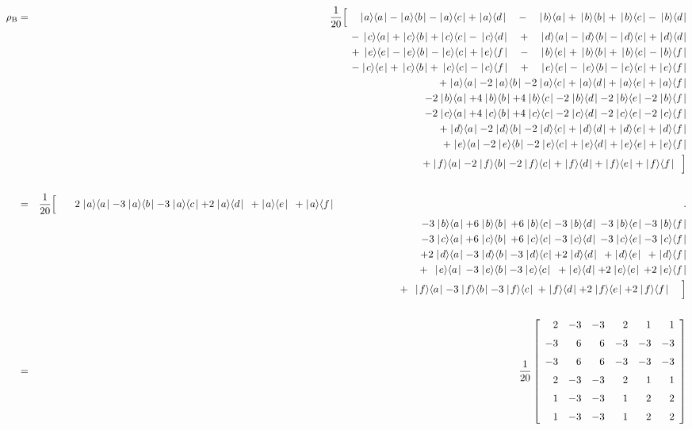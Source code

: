 \begin{eqnarray*}
	\rho_{\rm B}&=& \frac{1}{20}\Big[\quad\kb{a}{a}-\kb{a}{b}-\kb{a}{c}+\kb{a}{d}\quad-\quad\kb{b}{a}+\,\kb{b}{b}+\,\kb{b}{c}-\,\kb{b}{d} \\
		&&    \quad\:\:\,-\,\kb{c}{a}+\kb{c}{b}+\kb{c}{c}-\,\kb{c}{d} \quad+ \quad \kb{d}{a}-\kb{d}{b}-\kb{d}{c}+\kb{d}{d} \\
		&&    \quad\:\:\,+\,\kb{e}{e}-\kb{e}{b}-\kb{e}{c}+\kb{e}{f} \quad-\quad \kb{b}{e}+\,\kb{b}{b}+\,\kb{b}{c}-\kb{b}{f} \\
		&&    \quad\:\:\,-\kb{c}{e}+\,\kb{c}{b}+\,\kb{c}{c}-\kb{c}{f}\quad+\quad\kb{e}{e}-\,\kb{e}{b}-\kb{e}{c}+\kb{e}{f} \\
		&&    \quad\:\:\,+\kb{a}{a}-2\kb{a}{b}-2\kb{a}{c}+\kb{a}{d}+\kb{a}{e}+\kb{a}{f}   
		\\ &&  \quad\:\:\,- 2\kb{b}{a}+4\kb{b}{b}+4\kb{b}{c}-2\kb{b}{d}-2\kb{b}{e}-2\kb{b}{f} \\
		&&    \quad\:\:\,-2\kb{c}{a}+4\kb{c}{b}+4\kb{c}{c}-2\kb{c}{d}-2\kb{c}{e}-2\kb{c}{f}\\
		&& \quad\:\:\,+\kb{d}{a}-2\kb{d}{b}-2\kb{d}{c}+\kb{d}{d}+\kb{d}{e}+\kb{d}{f} \\
		&&  	\:\quad\:\:\, +\kb{e}{a}-2\kb{e}{b}-2\kb{e}{c}+\kb{e}{d}+\kb{e}{e}+\kb{e}{f}
		\\ && 	\:\quad\:\:\, +\kb{f}{a}-2\kb{f}{b}-2\kb{f}{c}+\kb{f}{d}+\kb{f}{e}+\kb{f}{f} \:\:\Big]
\\ \\
 &=& \frac{1}{20}\Big[\quad\;\;\;2\kb{a}{a} - 3\kb{a}{b} - 3\kb{a}{c} + 2\kb{a}{d} \,\;+\kb{a}{e}\;\, + \kb{a}{f} \qquad\qquad\qquad\qquad\qquad\qquad\qquad\qquad\qquad\qquad 
			\qquad\qquad\qquad\qquad\qquad\qquad\qquad.\\
		&& \qquad  \:\:\:\,- 3\kb{b}{a} +6\kb{b}{b} \,+6\kb{b}{c}-3\kb{b}{d}\, -3\kb{b}{e} -3\kb{b}{f} \\
		&& \qquad  \:\:\:\,- 3\kb{c}{a} +6\kb{c}{b} \,+6\kb{c}{c}-3\kb{c}{d} \,-3\kb{c}{e} -3\kb{c}{f} \\
		&& \qquad  \:\:\:\,+ 2\kb{d}{a} - 3\kb{d}{b} - 3\kb{d}{c} + 2\kb{d}{d} \;\,+\kb{d}{e}\;\, + \kb{d}{f} \\
		&& \qquad  \:\:\:\,+ \;\,\kb{e}{a}\, -3\kb{e}{b} -3\kb{e}{c}\;\:+ \kb{e}{d} + 2\kb{e}{e} \,+ 2\kb{e}{f} \\
		&& \qquad  \:\:\:\,+ \;\,\kb{f}{a} -3\kb{f}{b} -3\kb{f}{c}\:+ \kb{f}{d} + 2\kb{f}{e} + 2\kb{f}{f} \quad\Big] \\ \\ 
		&=& \frac{1}{20}\left[
			\begin {array}{rrrrrr}
			2&-3&-3&2&1&1\\
			\noalign{\medskip}
			-3&6&6&-3&-3&-3 \\ \noalign{\medskip}
			-3&6&6&-3&-3&-3 \\ \noalign{\medskip}
			2&-3&-3&2&1&1 \\ \noalign{\medskip}
			1&-3&-3&1&2&2 \\ \noalign{\medskip}
			1&-3&-3&1&2&2
			\end {array}
			\right]
\end{eqnarray*}
